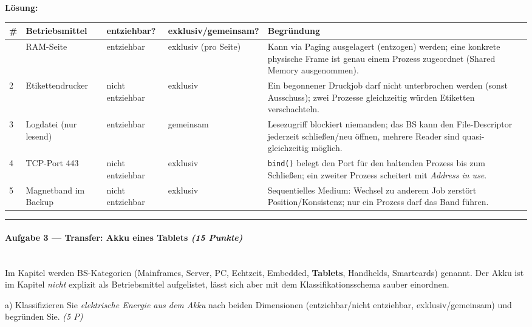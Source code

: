 \documentclass[11pt, a4paper]{article}
\begin{document}
\textbf{Lösung:}



{\small
\begin{tabularx}{\linewidth}{XXXXX}
\hline
\rowcolor{tableheadbg}
{\color{white}\textbf{\#}} & {\color{white}\textbf{Betriebsmittel}} & {\color{white}\textbf{entziehbar?}} & {\color{white}\textbf{exklusiv/gemeinsam?}} & {\color{white}\textbf{Begründung}} \\[2pt]
\hline
\endhead
\hline
\endfoot
1 & RAM-Seite & entziehbar & exklusiv (pro Seite) & Kann via Paging ausgelagert (entzogen) werden; eine konkrete physische Frame ist genau einem Prozess zugeordnet (Shared Memory ausgenommen). \\
2 & Etikettendrucker & nicht entziehbar & exklusiv & Ein begonnener Druckjob darf nicht unterbrochen werden (sonst Ausschuss); zwei Prozesse gleichzeitig würden Etiketten verschachteln. \\
3 & Logdatei (nur lesend) & entziehbar & gemeinsam & Lesezugriff blockiert niemanden; das BS kann den File-Descriptor jederzeit schließen/neu öffnen, mehrere Reader sind quasi-gleichzeitig möglich. \\
4 & TCP-Port 443 & nicht entziehbar & exklusiv & \texttt{bind()} belegt den Port für den haltenden Prozess bis zum Schließen; ein zweiter Prozess scheitert mit \textit{Address in use}. \\
5 & Magnetband im Backup & nicht entziehbar & exklusiv & Sequentielles Medium: Wechsel zu anderem Job zerstört Position/Konsistenz; nur ein Prozess darf das Band führen. \\
\end{tabularx}
}



\noindent\textcolor{rulegray}{\rule{\linewidth}{0.4pt}}


\paragraph{Aufgabe 3 — Transfer: Akku eines Tablets \textit{(15 Punkte)}}\mbox{}\\[2pt]

Im Kapitel werden BS-Kategorien (Mainframes, Server, PC, Echtzeit, Embedded, \textbf{Tablets}, Handhelds, Smartcards) genannt. Der Akku ist im Kapitel \textit{nicht} explizit als Betriebsmittel aufgelistet, lässt sich aber mit dem Klassifikationsschema sauber einordnen.


a) Klassifizieren Sie \textit{elektrische Energie aus dem Akku} nach beiden Dimensionen (entziehbar/nicht entziehbar, exklusiv/gemeinsam) und begründen Sie. \textit{(5 P)}
\end{document}
